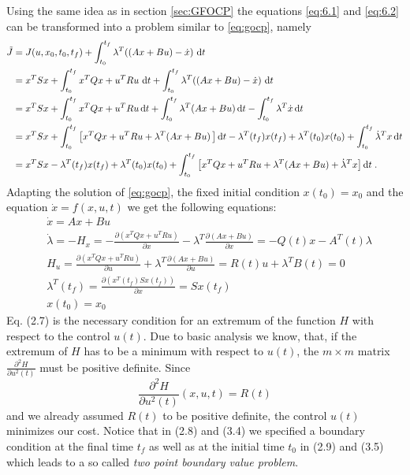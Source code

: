 \documentclass[paper=a4, pagesize, DIV=calc, BCOR=12.5mm, twoside=on, onecolumn=on, open = any, titlepage =on, parskip =half-, headsepline = on, footsepline = on, chapterprefix = on, appendixprefix = off, fontsize = 12pt, numbers = noenddot, abstract = on]{scrbook}
\numberwithin{equation}{chapter}
\theoremstyle{definition}
\theoremstyle{plain}
\theoremstyle{plain}
\theoremstyle{remark}
\theoremstyle{plain}
\theoremstyle{plain}
\begin{document}
Using the same idea as in section \ref{sec:GFOCP} the equations \eqref{eq:6.1} and \eqref{eq:6.2} can be transformed into a problem similar to \eqref{eq:gocp}, namely
\begin{align*}
\tilde{J} & = J(u, x_0, t_0, t_f) + \int_{t_0}^{t_f} \lambda^T ((Ax + Bu) - \dot{x}) \,\diff t\\
 & = x^TSx + \int_{t_0}^{t_f} x^TQx + u^TRu \,\diff t + \int_{t_0}^{t_f} \lambda^T((Ax +Bu) -\dot{x}) \,\diff t\\
  & = x^TSx + \int_{t_0}^{t_f}x^TQx + u^TRu \diff t + \int_{t_0}^{t_f}\lambda^T (Ax + Bu) \diff t - \int_{t_0}^{t_f} \lambda^T \dot{x} \diff t\\
   & = x^TSx + \int_{t_0}^{t_f} \left[ x^TQx + u^TRu+\lambda^T(Ax+Bu) \,\right] \diff t - \lambda^T(t_f) x(t_f) + \lambda^T(t_0) x(t_0) + \int_{t_0}^{t_f} \dot{\lambda}^T x \diff t\\
    & = x^TSx - \lambda^T (t_f)x(t_f) + \lambda^T(t_0) x(t_0) + \int_{t_0}^{t_f} \left[ x^TQx + u^TRu+\lambda^T(Ax+Bu) + \dot{\lambda}^T x \right]\diff t \; .
\end{align*}
Adapting the solution of \eqref{eq:gocp}, the fixed initial condition $x(t_0) = x_0$ and the equation $\dot{x} = f(x, u, t)$ we get the following equations:
\begin{align}
& \dot{x} = Ax + Bu\\
& \dot{\lambda} = -H_x = - \frac{\partial \left(x^TQx + u^TRu \right)}{\partial x} - \lambda^T \frac{\partial \left(Ax+Bu\right)}{\partial x} = - Q(t)x - A^T(t)\lambda\\
& H_u = \frac{\partial \left(x^TQx + u^TRu \right)}{\partial u} + \lambda^T \frac{\partial \left(Ax+Bu\right)}{\partial u} = R(t)u + \lambda^T B(t) = 0\\
& \lambda^T(t_f) = \frac{\partial \left( x^T(t_f)Sx(t_f) \right)}{\partial x} = Sx(t_f)\\
& x(t_0) = x_0
\end{align}
Eq. (2.7) is the necessary condition for an extremum of the function $H$ with respect to the control $u(t)$. Due to basic analysis we know, that, if the extremum of $H$ has to be a minimum with respect to $u(t)$, the $m \times m$ matrix $\frac{\partial^2 H}{\partial u^2(t)}$ must be positive definite. Since \begin{equation*}
\frac{\partial^2 H}{\partial u^2(t)}(x, u, t) = R(t)
\end{equation*} and we already assumed $R(t)$ to be positive definite, the control $u(t)$ minimizes our cost.
Notice that in (2.8) and (3.4) we specified a boundary condition at the final time $t_f$ as well as at the initial time $t_0$ in (2.9) and (3.5) which leads to a so called \emph{two point boundary value problem}.\\
\end{document}

